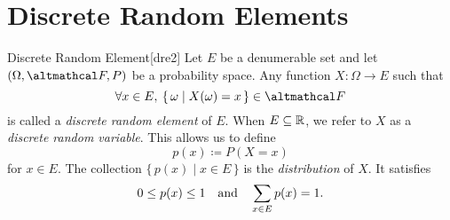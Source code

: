 \documentclass[../probability.tex]{subfiles}
\begin{document}
\section{Discrete Random Elements}

\begin{Definition}{Discrete Random Element}[dre2]
    Let \(E\) be a denumerable set and let \((\Omega, \mcal{F}, P)\) be a
    probability space. Any function \(X \colon \Omega \to E\) such that
    \[
        \fall x \in E,\: \{\,\omega \mid X(\omega) = x\,\} \in \mcal{F}
    \]
    is called a \emph{discrete random element} of \(E\).
    When \(E \subseteq \RR\), we refer to \(X\) as a \emph{discrete random variable}.
    This allows us to define
    \[
        p(x) \coloneqq P(X = x)
    \]
    for \(x \in E\).
    The collection \(\{\,p(x) \mid x \in E\,\}\)
    is the \emph{distribution} of \(X\). It satisfies
    \[
        0 \le p(x) \le 1\quad\text{and}\quad
        \sum_{x \in E} p(x) = 1\text.
    \]
\end{Definition}

\end{document}

